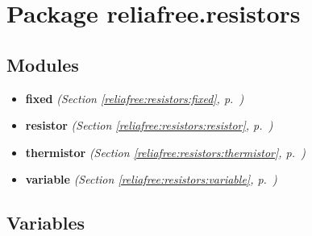 %
%
%


\section{Package reliafree.resistors}

    \label{reliafree:resistors}


\subsection{Modules}

\begin{itemize}
\setlength{\parskip}{0ex}
\item \textbf{fixed}
  \textit{(Section \ref{reliafree:resistors:fixed}, p.~\pageref{reliafree:resistors:fixed})}

\item \textbf{resistor}
  \textit{(Section \ref{reliafree:resistors:resistor}, p.~\pageref{reliafree:resistors:resistor})}

\item \textbf{thermistor}
  \textit{(Section \ref{reliafree:resistors:thermistor}, p.~\pageref{reliafree:resistors:thermistor})}

\item \textbf{variable}
  \textit{(Section \ref{reliafree:resistors:variable}, p.~\pageref{reliafree:resistors:variable})}

\end{itemize}



  \subsection{Variables}

